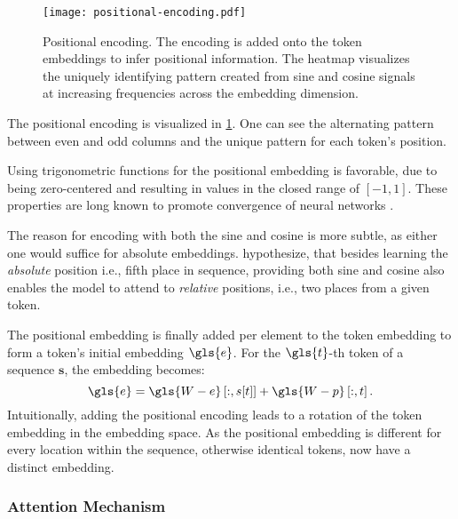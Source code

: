 \begin{figure}[ht]
    \centering
    \texttt{[image: positional-encoding.pdf]}
    \caption[Positional Encoding of Transformer]{Positional encoding. The encoding is added onto the \gls{token} embeddings to infer positional information. The heatmap visualizes the uniquely identifying pattern created from sine and cosine signals at increasing frequencies across the embedding dimension.}
    \label{fig:positional-embedding}
\end{figure}

The positional encoding is visualized in \cref{fig:positional-embedding}. One can see the alternating pattern between even and odd columns and the unique pattern for each \gls{token}'s position.

Using trigonometric functions for the positional embedding is favorable, due to being zero-centered and resulting in values in the closed range of $[-1,1]$. These properties are long known to promote convergence of neural networks \autocites[][16--17]{lecunEfficientBackProp2012}[][2]{ioffeBatchNormalizationAccelerating2015}.

The reason for encoding with both the sine and cosine is more subtle, as either one would suffice for absolute embeddings. \textcite[][6006]{vaswaniAttentionAllYou2017} hypothesize, that besides learning the \emph{absolute} position i.e., fifth place in sequence, providing both sine and cosine also enables the model to attend to \emph{relative} positions, i.e., two places from a given \gls{token}.

The positional embedding is finally added per element to the token embedding to form a \gls{token}'s initial embedding $\gls{e}$. For the $\gls{t}$-th \gls{token} of a sequence $\mathbf{s}$, the embedding becomes:
\begin{equation}
    \gls{e}=\gls{W-e}\left[:, s[t]\right]+\gls{W-p}\left[:, t\right].
    \label{eq:positional-embedding}
\end{equation}
Intuitionally, adding the positional encoding leads to a rotation of the \gls{token} embedding in the embedding space. As the positional embedding is different for every location within the sequence, otherwise identical \glspl{token}, now have a distinct embedding.

\subsubsection{Attention Mechanism}\label{sec:attention}

